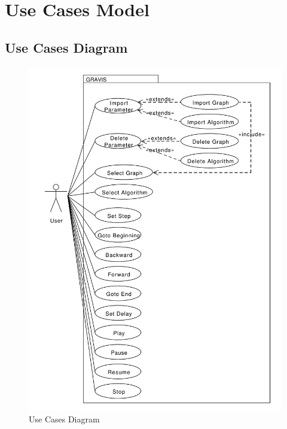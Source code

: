 \section{Use Cases Model}
\label{sec:use_cases_model}

\subsection{Use Cases Diagram}
\label{subsec:use_cases_diagram}
\begin{figure}[H]
	\includegraphics[scale=0.5]{diagrams/use-cases-diagram.pdf}
    \caption{Use Cases Diagram}
    \label{fig:use_cases_diagram}
\end{figure}

